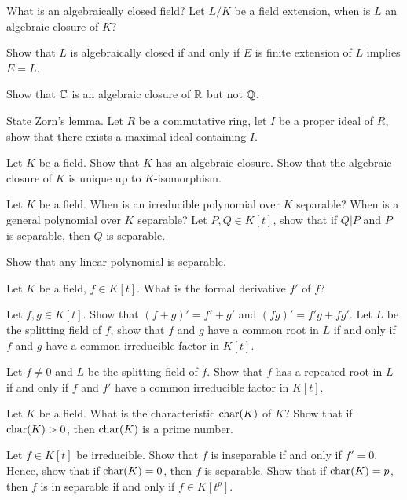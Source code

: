\begin{question}{13}
    What is an algebraically closed field? Let $L/K$ be a field extension, when is $L$ an algebraic closure of $K$?

    Show that $L$ is algebraically closed if and only if $E$ is finite extension of $L$ implies $E = L$.

    Show that $\mathbb{C}$ is an algebraic closure of $\mathbb{R}$ but not $\mathbb{Q}$.
\end{question}

\begin{question}{14}
    State Zorn's lemma. Let $R$ be a commutative ring, let $I$ be a proper ideal of $R$, show that there exists a maximal ideal containing $I$.

    Let $K$ be a field. Show that $K$ has an algebraic closure. Show that the algebraic closure of $K$ is unique up to $K$-isomorphism.
\end{question}

\begin{question}{15}
    Let $K$ be a field. When is an irreducible polynomial over $K$ separable? When is a general polynomial over $K$ separable? Let $P,Q \in K[t]$, show that if $Q | P$ and $P$ is separable, then $Q$ is separable.

    Show that any linear polynomial is separable.
\end{question}

\begin{question}{16}
    Let $K$ be a field, $f \in K[t]$. What is the formal derivative $f'$ of $f$? 

    Let $f,g \in K[t]$. Show that $(f + g)' = f' + g'$ and $(fg)' = f'g + fg'$. Let $L$ be the splitting field of $f$, show that $f$ and $g$ have a common root in $L$ if and only if $f$ and $g$ have a common irreducible factor in $K[t]$.

    Let $f \not = 0$ and $L$ be the splitting field of $f$. Show that $f$ has a repeated root in $L$ if and only if $f$ and $f'$ have a common irreducible factor in $K[t]$.
\end{question}

\begin{question}{17}
    Let $K$ be a field. What is the characteristic $\text{char}(K)$ of $K$? Show that if $\text{char}(K) > 0$, then $\text{char}(K)$ is a prime number.

    Let $f \in K[t]$ be irreducible. Show that $f$ is inseparable if and only if $f' = 0$. Hence, show that if $\text{char}(K) = 0$, then $f$ is separable. Show that if $\text{char}(K) = p$, then $f$ is in separable if and only if $f \in K[t^p]$.
\end{question}

